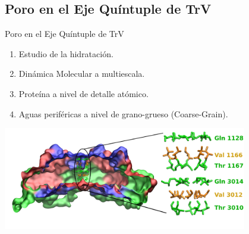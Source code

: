 \documentclass[8pt]{beamer}
\begin{document}
\subsection{Poro en el Eje Quíntuple de TrV}
\begin{frame}[t]{Poro en el Eje Quíntuple de TrV}
\begin{minipage}{0.4\textwidth}
\justifying
\begin{enumerate}[$\bullet$]
\item Estudio de la hidratación.
\item Dinámica Molecular a multiescala.
\item Proteína a nivel de detalle atómico.
\item Aguas periféricas a nivel de grano-grueso (Coarse-Grain).
\end{enumerate}
\end{minipage}
\hfill
\begin{minipage}{0.59\textwidth}
\end{minipage}
\vspace{0.4cm}
\begin{center}
\includegraphics[width=0.8\textwidth]{Figure/TrV_Sideview_Pore.png}
    
\end{center}
\end{frame}
\end{document}
